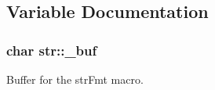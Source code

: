 \subsection{Variable Documentation}
\hypertarget{namespacestr_a51a7257ade189ec55f5d1c9da0f0e8b4}{
\subsubsection[{\-\_\-buf}]{\setlength{\rightskip}{0pt plus 5cm}char {\bf str\-::\-\_\-buf}}}\label{namespacestr_a51a7257ade189ec55f5d1c9da0f0e8b4}
Buffer for the {\ttfamily str\-Fmt} macro. 